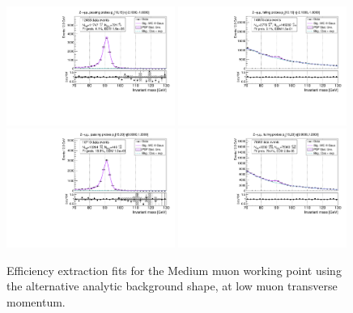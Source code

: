 {\begin{figure}
\centering
\includegraphics[width=0.49\textwidth]{figures/Zmm_RecoTemplate_BkgAnalytic_pass_ptBin0_etaBin1.pdf}
\includegraphics[width=0.49\textwidth]{figures/Zmm_RecoTemplate_BkgAnalytic_fail_ptBin0_etaBin1.pdf}
\includegraphics[width=0.49\textwidth]{figures/Zmm_RecoTemplate_BkgAnalytic_pass_ptBin1_etaBin9.pdf}
\includegraphics[width=0.49\textwidth]{figures/Zmm_RecoTemplate_BkgAnalytic_fail_ptBin1_etaBin9.pdf}
\caption{Efficiency extraction fits for the Medium muon working point using the alternative analytic background shape, at low muon transverse momentum.}
\label{fig:ZmmAltBkgFits1}
\end{figure}

}
